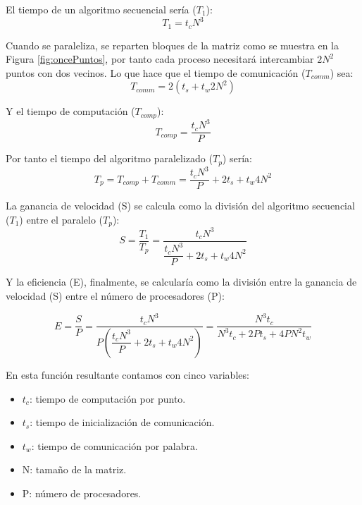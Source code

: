 El tiempo de un algoritmo secuencial sería ($T_{1}$):
\begin{equation}
	T_{1} = t_{c}N^{3}
\end{equation}

Cuando se paraleliza, se reparten bloques de la matriz como se muestra en la Figura \ref{fig:oncePuntos}, por tanto cada proceso necesitará intercambiar $2N^{2}$ puntos con dos vecinos. Lo que hace que el tiempo de comunicación ($T_{comm}$) sea:
\begin{equation}
	T_{comm} = 2(t_{s} + t_{w}2N^{2})
\end{equation}

Y el tiempo de computación ($T_{comp}$):
\begin{equation}
	T_{comp} = \dfrac{t_{c}N^{3}}{P} 
\end{equation}

Por tanto el tiempo del algoritmo paralelizado ($T_{p}$) sería:
\begin{equation}
	T_{p} = T_{comp} + T_{comm} = \dfrac{t_{c}N^{3}}{P} + 2t_{s} + t_{w}4N^{2}
\end{equation}

La ganancia de velocidad (S) se calcula como la división del algoritmo secuencial ($T_{1}$) entre el paralelo ($T_{p}$):
\begin{equation}
	S = \dfrac{T_{1}}{T_{p}} = \dfrac{t_{c}N^{3}}{\dfrac{t_{c}N^{3}}{P} + 2t_{s} + t_{w}4N^{2}}
\end{equation}

Y la eficiencia (E), finalmente, se calcularía como la división entre la ganancia de velocidad (S) entre el número de procesadores (P):

\begin{equation}
	E = \dfrac{S}{P} = \dfrac{t_{c}N^{3}}{P( \dfrac{t_{c}N^{3}}{P} + 2t_{s} + t_{w}4N^{2})} = \dfrac{N^{3}t_{c}}{N^{3}t_{c} + 2Pt_{s} + 4PN^{2}t_{w}}
\end{equation}

En esta función resultante contamos con cinco variables:
\begin{itemize}
	\item $t_{c}$: tiempo de computación por punto.
	\item $t_{s}$: tiempo de inicialización de comunicación.
	\item $t_{w}$: tiempo de comunicación por palabra.
	\item N: tamaño de la matriz.
	\item P: número de procesadores.
\end{itemize}

